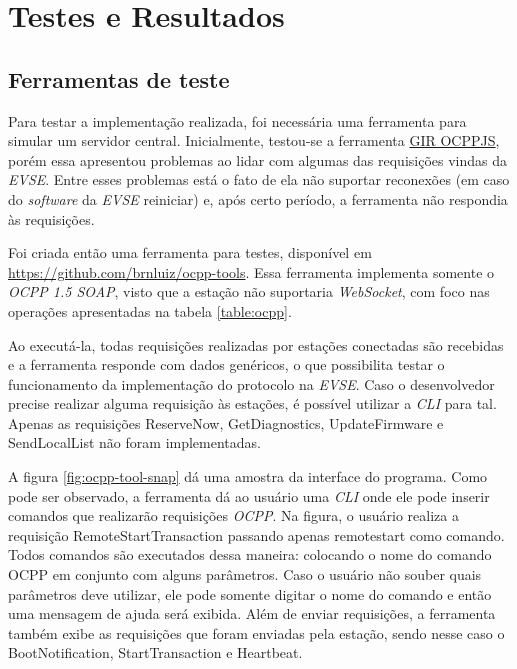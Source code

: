 \chapter{Testes e Resultados}
\label{tests:tests}

  \section{Ferramentas de teste}
  \label{tests:tools}

    Para testar a implementação realizada, foi necessária uma ferramenta para simular um servidor central. Inicialmente, testou-se a ferramenta \href{http://www.gir.fr/ocppjs/}{GIR OCPPJS}, porém essa apresentou problemas ao lidar com algumas das requisições vindas da \textit{\ac{EVSE}}. Entre esses problemas está o fato de ela não suportar reconexões (em caso do \textit{software} da \textit{\ac{EVSE}} reiniciar) e, após certo período, a ferramenta não respondia às requisições.

    Foi criada então uma ferramenta para testes, disponível em \url{https://github.com/brnluiz/ocpp-tools}. Essa ferramenta implementa somente o \textit{\ac{OCPP} 1.5 \ac{SOAP}}, visto que a estação não suportaria \textit{WebSocket}, com foco nas operações apresentadas na tabela \ref{table:ocpp}.

    Ao executá-la, todas requisições realizadas por estações conectadas são recebidas e a ferramenta responde com dados genéricos, o que possibilita testar o funcionamento da implementação do protocolo na \textit{\ac{EVSE}}. Caso o desenvolvedor precise realizar alguma requisição às estações, é possível utilizar a \textit{\ac{CLI}} para tal. Apenas as requisições ReserveNow, GetDiagnostics, UpdateFirmware e SendLocalList não foram implementadas. 

    A figura \ref{fig:ocpp-tool-snap} dá uma amostra da interface do programa. Como pode ser observado, a ferramenta dá ao usuário uma \textit{\ac{CLI}} onde ele pode inserir comandos que realizarão requisições \textit{\ac{OCPP}}. Na figura, o usuário realiza a requisição RemoteStartTransaction passando apenas remotestart como comando. Todos comandos são executados dessa maneira: colocando o nome do comando OCPP em conjunto com alguns parâmetros. Caso o usuário não souber quais parâmetros deve utilizar, ele pode somente digitar o nome do comando e então uma mensagem de ajuda será exibida. Além de enviar requisições, a ferramenta também exibe as requisições que foram enviadas pela estação, sendo nesse caso o BootNotification, StartTransaction e Heartbeat.

